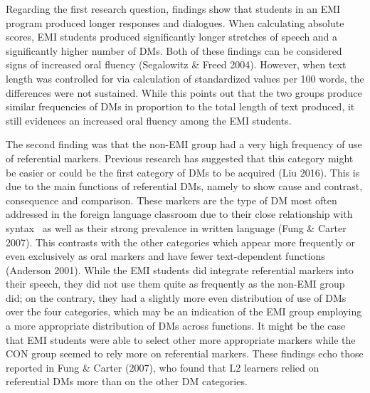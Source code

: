 \documentclass[12pt]{article}
\newenvironment{styleStandard}{\setlength\leftskip{0cm}\setlength\rightskip{0cm plus 1fil}\setlength\parindent{0cm}\setlength\parfillskip{0pt plus 1fil}\setlength\parskip{0in plus 1pt}\writerlistparindent\writerlistleftskip\leavevmode\normalfont\normalsize\writerlistlabel\ignorespaces}{\unskip\vspace{0.111in plus 0.0111in}\par}
\newcommand\writerlistleftskip{}
\newcommand\writerlistparindent{}
\newcommand\writerlistlabel{}
\begin{document}
\begin{styleStandard}
Regarding the first research question, findings show that students in an EMI program produced longer responses and dialogues. When calculating absolute scores, EMI students produced significantly longer stretches of speech and a significantly higher number of DMs. Both of these findings can be considered signs of increased oral fluency (Segalowitz \& Freed 2004). However, when text length was controlled for via calculation of standardized values per 100 words, the differences were not sustained. While this points out that the two groups produce similar frequencies of DMs in proportion to the total length of text produced, it still evidences an increased oral fluency among the EMI students.
\end{styleStandard}

\begin{styleStandard}
The second finding was that the non-EMI group had a very high frequency of use of referential markers. Previous research has suggested that this category might be easier or could be the first category of DMs to be acquired (Liu 2016). This is due to the main functions of referential DMs, namely to show cause and contrast, consequence and comparison. These markers are the type of DM most often addressed in the foreign language classroom due to their close relationship with syntax \ as well as their strong prevalence in written language (Fung \& Carter 2007). This contrasts with the other categories which appear more frequently or even exclusively as oral markers and have fewer text-dependent functions (Anderson 2001). While the EMI students did integrate referential markers into their speech, they did not use them quite as frequently as the non-EMI group did; on the contrary, they had a slightly more even distribution of use of DMs over the four categories, which may be an indication of the EMI group employing a more appropriate distribution of DMs across functions. It might be the case that EMI students were able to select other more appropriate markers while the CON group seemed to rely more on referential markers. These findings echo those reported in Fung \& Carter (2007), who found that L2 learners relied on referential DMs more than on the other DM categories. 
\end{styleStandard}
\end{document}
